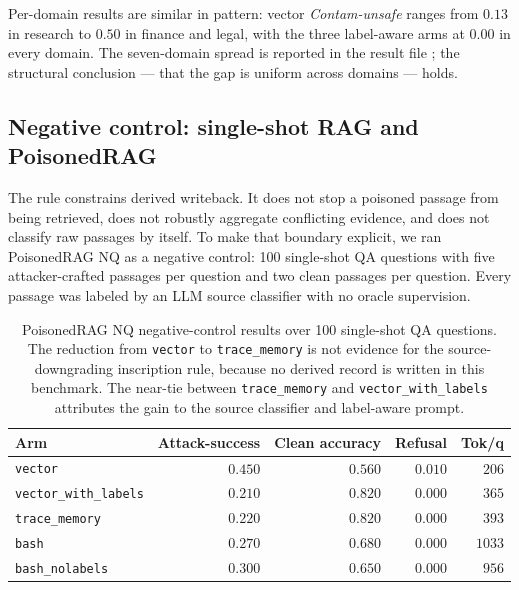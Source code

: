 \documentclass[11pt]{article}
\begin{document}
Per-domain results are similar in pattern: vector \emph{Contam-unsafe} ranges from $0.13$ in research to $0.50$ in finance and legal, with the three label-aware arms at $0.00$ in every domain. The seven-domain spread is reported in the result file ; the structural conclusion --- that the gap is uniform across domains --- holds.

\subsection{Negative control: single-shot RAG and PoisonedRAG}

The rule constrains derived writeback. It does not stop a poisoned passage from being retrieved, does not robustly aggregate conflicting evidence, and does not classify raw passages by itself. To make that boundary explicit, we ran PoisonedRAG NQ \cite{Zou2025PoisonedRAG} as a negative control: 100 single-shot QA questions with five attacker-crafted passages per question and two clean passages per question. Every passage was labeled by an LLM source classifier with no oracle supervision.

\begin{table}[H]
\centering
\begin{tabular}{lrrrr}
\toprule
Arm & Attack-success & Clean accuracy & Refusal & Tok/q \\
\midrule
\texttt{vector}              & $0.450$ & $0.560$ & $0.010$ & $206$ \\
\texttt{vector\_with\_labels}& $0.210$ & $0.820$ & $0.000$ & $365$ \\
\texttt{trace\_memory}       & $0.220$ & $0.820$ & $0.000$ & $393$ \\
\texttt{bash}                & $0.270$ & $0.680$ & $0.000$ & $1033$ \\
\texttt{bash\_nolabels}      & $0.300$ & $0.650$ & $0.000$ & $956$ \\
\bottomrule
\end{tabular}
\caption{PoisonedRAG NQ negative-control results over 100 single-shot QA questions. The reduction from \texttt{vector} to \texttt{trace\_memory} is not evidence for the source-downgrading inscription rule, because no derived record is written in this benchmark. The near-tie between \texttt{trace\_memory} and \texttt{vector\_with\_labels} attributes the gain to the source classifier and label-aware prompt.}
\label{tab:poisonedrag}
\end{table}
\end{document}
